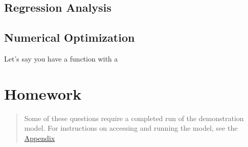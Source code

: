 \documentclass[]{book}
\begin{document}
\hypertarget{regression-analysis}{%
\subsection{Regression Analysis}\label{regression-analysis}}

\hypertarget{numerical-optimization}{%
\subsection{Numerical Optimization}\label{numerical-optimization}}

Let's say you have a function with a

\hypertarget{hw-blocks}{%
\section*{Homework}\label{hw-blocks}}

\begin{quote}
Some of these questions require a completed run of the demonstration model.
For instructions on accessing and running the model, see the \protect\hyperlink{app-demomodel}{Appendix}
\end{quote}
\end{document}
